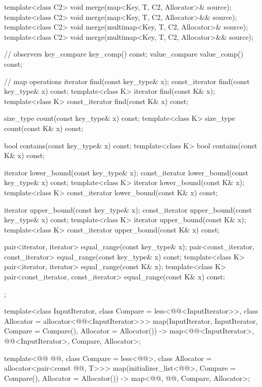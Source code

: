 \documentclass{wg21}
\begin{document}
\begin{codeblock}
{{        template<class C2>
        void merge(map<Key, T, C2, Allocator>& source);
        template<class C2>
        void merge(map<Key, T, C2, Allocator>&& source);
        template<class C2>
        void merge(multimap<Key, T, C2, Allocator>& source);
        template<class C2>
        void merge(multimap<Key, T, C2, Allocator>&& source);

        // observers
        key_compare key_comp() const;
        value_compare value_comp() const;

        // map operations
        iterator       find(const key_type& x);
        const_iterator find(const key_type& x) const;
        template<class K> iterator       find(const K& x);
        template<class K> const_iterator find(const K& x) const;

        size_type      count(const key_type& x) const;
        template<class K> size_type count(const K& x) const;

        bool           contains(const key_type& x) const;
        template<class K> bool contains(const K& x) const;

        iterator       lower_bound(const key_type& x);
        const_iterator lower_bound(const key_type& x) const;
        template<class K> iterator       lower_bound(const K& x);
        template<class K> const_iterator lower_bound(const K& x) const;

        iterator       upper_bound(const key_type& x);
        const_iterator upper_bound(const key_type& x) const;
        template<class K> iterator       upper_bound(const K& x);
        template<class K> const_iterator upper_bound(const K& x) const;

        pair<iterator, iterator>               equal_range(const key_type& x);
        pair<const_iterator, const_iterator>   equal_range(const key_type& x) const;
        template<class K>
        pair<iterator, iterator>             equal_range(const K& x);
        template<class K>
        pair<const_iterator, const_iterator> equal_range(const K& x) const;
    };

    template<class InputIterator, class Compare = less<@@<InputIterator>>,
    class Allocator = allocator<@@<InputIterator>>>
    map(InputIterator, InputIterator, Compare = Compare(), Allocator = Allocator())
    -> map<@@<InputIterator>, @@<InputIterator>, Compare, Allocator>;

    template<@@ @@, class Compare = less<@@>,
    class Allocator = allocator<pair<const @@, T>>>
    map(initializer_list<@@>, Compare = Compare(), Allocator = Allocator())
    -> map<@@, @@, Compare, Allocator>;

}
\end{codeblock}
\end{document}
